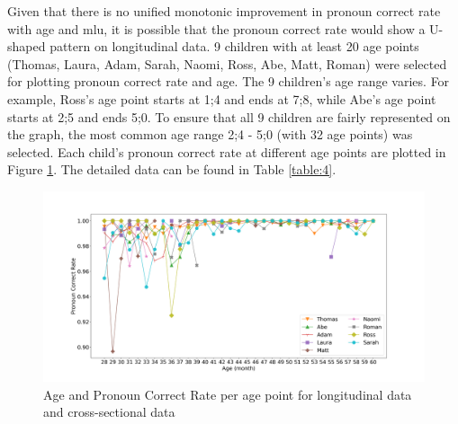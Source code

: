 Given that there is no unified monotonic improvement in pronoun correct rate with age and mlu, it is possible that the pronoun correct rate would show a U-shaped pattern on longitudinal data. 9 children with at least 20 age points (Thomas, Laura, Adam, Sarah, Naomi, Ross, Abe, Matt, Roman) were selected for plotting pronoun correct rate and age. The 9 children's age range varies. For example, Ross's age point starts at 1;4 and ends at 7;8, while Abe's age point starts at 2;5 and ends 5;0. To ensure that all 9 children are fairly represented on the graph, the most common age range 2;4 - 5;0 (with 32 age points) was selected. Each child's pronoun correct rate at different age points are plotted in Figure \ref{fig:1}. The detailed data can be found in Table \ref{table:4}. 
\vspace{-1em}
\FloatBarrier
\begin{figure}[!h]
\small
\centering
\includegraphics[scale = 0.35, width = \linewidth]{graph/Age1month.png}
\vspace{-2em}
\caption{Age and Pronoun Correct Rate per age point for longitudinal data and cross-sectional data }
\label{fig:1}
\end{figure}
\FloatBarrier

